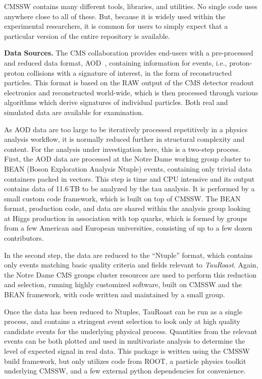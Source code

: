 \documentclass{sig-alternate}
\begin{document}
CMSSW contains many different tools, libraries, and utilities.  No single code uses anywhere close to all of these.  But, because it is widely used within the experimental researchers, it is common for users to simply expect that a particular version of the entire repository is available.
 
{\bf Data Sources.}
The CMS collaboration provides end-users with a pre-processed
and reduced data format, AOD~\cite{holtman2001cms}, containing information for events, i.e.,
proton-proton collisions with a signature of interest, in the form of
reconstructed particles.  This format is based on the RAW output of
the CMS detector readout electronics and reconstructed world-wide, which is then processed through various algorithms which derive signatures of individual particles.
Both real and simulated data are available for examination.

As AOD data are too large to be iteratively processed repetitively in
a physics analysis workflow, it is normally reduced further in
structural complexity and content.  For the analysis under
investigation here, this is a two-step process.  First, the AOD data
are processed at the Notre Dame working group cluster to BEAN (Boson Exploration Analysis Ntuple) events,
containing only trivial data containers packed in vectors.  This step
is time and CPU intensive and its output contains data of 11.6$\,$TB to be
analyzed by the tau analysis.
It is performed by a small custom code framework, which is built on top of CMSSW.
The BEAN format, production code, and
data are shared within the analysis group looking at Higgs production
in association with top quarks, which is formed by groups from a few
American and European universities,
consisting of up to a few dozen contributors.

In the second step, the data are reduced to the ``Ntuple'' format,
which contains only events matching basic quality criteria and
fields relevant to \emph{TauRoast}.
Again, the Notre Dame CMS groups cluster
resources are used to perform this reduction and selection,
running highly customized software,
built on CMSSW and the BEAN framework,
with code written and maintained by a small group.

Once the data has been reduced to Ntuples, TauRoast can be run as a single
process, and contains a stringent event selection to look only at high
quality candidate events for the underlying physical process.
Quantities from the relevant events can be
both plotted and used in multivariate analysis to determine the level
of expected signal in real data.
This package is written using the CMSSW build framework,
but only utilizes code from ROOT,
a particle physics toolkit underlying CMSSW,
and a few external python dependencies for convenience.
\end{document}
